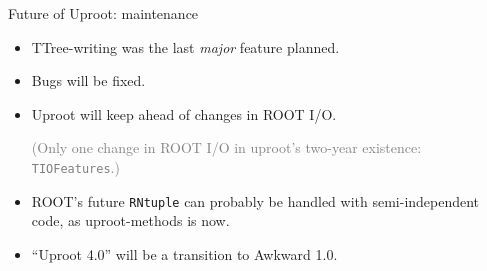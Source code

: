 \documentclass[aspectratio=169]{beamer}
\begin{document}
\begin{frame}{Future of Uproot: maintenance}
\Large
\vspace{0.35 cm}
\begin{itemize}\setlength{\itemsep}{0.25 cm}
\item<1-> TTree-writing was the last {\it major} feature planned.
\item<2-> Bugs will be fixed.
\item<3-> Uproot will keep ahead of changes in ROOT I/O.

\vspace{0.05 cm}
\textcolor{gray}{\normalsize (Only one change in ROOT I/O in uproot's two-year existence: \texttt{TIOFeatures}.)}

\item<4-> ROOT's future \texttt{RNtuple} can probably be handled with semi-independent code, as uproot-methods is now.
\item<5-> ``Uproot 4.0'' will be a transition to Awkward 1.0.
\end{itemize}

\normalsize
\vspace{0.25 cm}
\end{frame}
\end{document}
